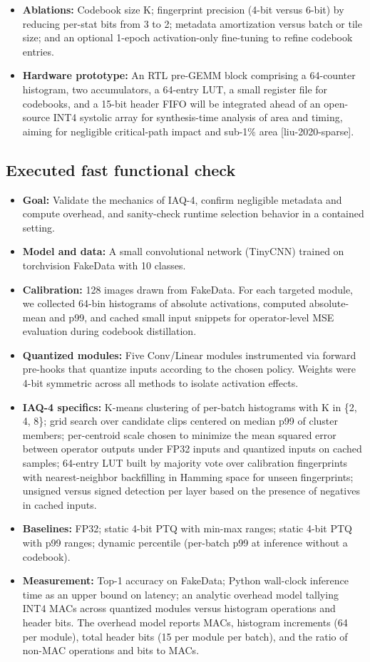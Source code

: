 \documentclass{article}
\begin{document}
\begin{itemize}
\item \textbf{Ablations:} Codebook size K; fingerprint precision (4-bit versus 6-bit) by reducing per-stat bits from 3 to 2; metadata amortization versus batch or tile size; and an optional 1-epoch activation-only fine-tuning to refine codebook entries.
\item \textbf{Hardware prototype:} An RTL pre-GEMM block comprising a 64-counter histogram, two accumulators, a 64-entry LUT, a small register file for codebooks, and a 15-bit header FIFO will be integrated ahead of an open-source INT4 systolic array for synthesis-time analysis of area and timing, aiming for negligible critical-path impact and sub-1\% area [liu-2020-sparse].
\end{itemize}

\subsection{Executed fast functional check}
\begin{itemize}
\item \textbf{Goal:} Validate the mechanics of IAQ-4, confirm negligible metadata and compute overhead, and sanity-check runtime selection behavior in a contained setting.
\item \textbf{Model and data:} A small convolutional network (TinyCNN) trained on torchvision FakeData with 10 classes.
\item \textbf{Calibration:} 128 images drawn from FakeData. For each targeted module, we collected 64-bin histograms of absolute activations, computed absolute-mean and p99, and cached small input snippets for operator-level MSE evaluation during codebook distillation.
\item \textbf{Quantized modules:} Five Conv/Linear modules instrumented via forward pre-hooks that quantize inputs according to the chosen policy. Weights were 4-bit symmetric across all methods to isolate activation effects.
\item \textbf{IAQ-4 specifics:} K-means clustering of per-batch histograms with K in \{2, 4, 8\}; grid search over candidate clips centered on median p99 of cluster members; per-centroid scale chosen to minimize the mean squared error between operator outputs under FP32 inputs and quantized inputs on cached samples; 64-entry LUT built by majority vote over calibration fingerprints with nearest-neighbor backfilling in Hamming space for unseen fingerprints; unsigned versus signed detection per layer based on the presence of negatives in cached inputs.
\item \textbf{Baselines:} FP32; static 4-bit PTQ with min-max ranges; static 4-bit PTQ with p99 ranges; dynamic percentile (per-batch p99 at inference without a codebook).
\item \textbf{Measurement:} Top-1 accuracy on FakeData; Python wall-clock inference time as an upper bound on latency; an analytic overhead model tallying INT4 MACs across quantized modules versus histogram operations and header bits. The overhead model reports MACs, histogram increments (64 per module), total header bits (15 per module per batch), and the ratio of non-MAC operations and bits to MACs.
\end{itemize}
\end{document}
